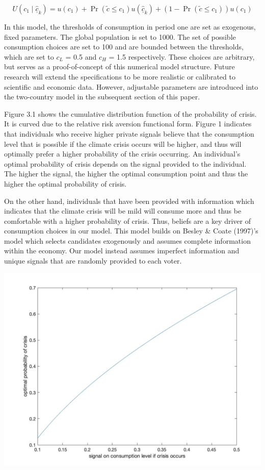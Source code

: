 \documentclass[11pt,preprint, authoryear]{elsarticle}
\let\origfigure\figure
\let\endorigfigure\endfigure
\renewenvironment{figure}[1][2] {
    \expandafter\origfigure\expandafter[H]
} {
    \endorigfigure
}
\numberwithin{equation}{section}
\numberwithin{figure}{section}
\numberwithin{table}{section}
\begin{document}
\[
U\left(c_1 \mid \hat{\underline{c}}_{k}\right)=u\left(c_1\right)+\operatorname{Pr}\left(\tilde{c} \leq c_1\right) u\left(\hat{\underline{c}}_{k}\right)+\left(1-\operatorname{Pr}\left(\tilde{c} \leq c_1\right)\right) u\left(c_1\right)
\]

In this model, the thresholds of consumption in period one are set as
exogenous, fixed parameters. The global population is set to 1000. The
set of possible consumption choices are set to 100 and are bounded
between the thresholds, which are set to \(c_L\) = 0.5 and \(c_H\) = 1.5
respectively. These choices are arbitrary, but serves as a
proof-of-concept of this numerical model structure. Future research will
extend the specifications to be more realistic or calibrated to
scientific and economic data. However, adjustable parameters are
introduced into the two-country model in the subsequent section of this
paper.

Figure 3.1 shows the cumulative distribution function of the probability
of crisis. It is curved due to the relative risk aversion functional
form. Figure 1 indicates that individuals who receive higher private
signals believe that the consumption level that is possible if the
climate crisis occurs will be higher, and thus will optimally prefer a
higher probability of the crisis occurring. An individual's optimal
probability of crisis depends on the signal provided to the individual.
The higher the signal, the higher the optimal consumption point and thus
the higher the optimal probability of crisis.

On the other hand, individuals that have been provided with information
which indicates that the climate crisis will be mild will consume more
and thus be comfortable with a higher probability of crisis. Thus,
beliefs are a key driver of consumption choices in our model. This model
builds on Besley \& Coate (1997)'s model which selects candidates
exogenously and assumes complete information within the economy. Our
model instead assumes imperfect information and unique signals that are
randomly provided to each voter.

\begin{figure}[H]

{\centering \includegraphics[width=0.8\linewidth]{images/Figure1base} 

}

\caption{Optimal probability of crisis as mapped from different beliefs about the optimal consumption level}\label{fig:Fig 3.1}
\end{figure}
\end{document}
